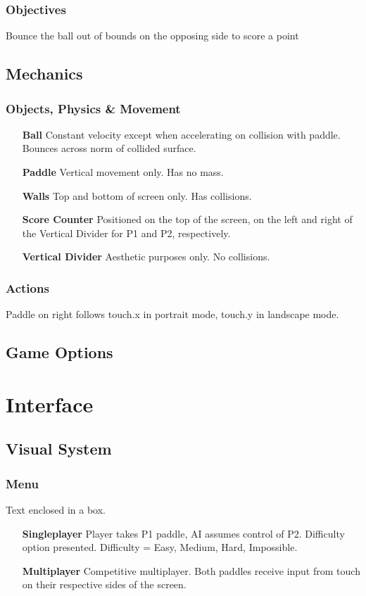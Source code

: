 \documentclass[12pt, letterpaper]{article}
\begin{document}
        \subsubsection{Objectives}
        Bounce the ball out of bounds on the opposing side to score a point
    \subsection{Mechanics}
        \subsubsection{Objects, Physics \& Movement}
        \begin{itemize}
            \item[\textbf{Ball}] Constant velocity except when accelerating on collision with paddle. Bounces across norm of collided surface.
            \item[\textbf{Paddle}] Vertical movement only. Has no mass.
            \item[\textbf{Walls}] Top and bottom of screen only. Has collisions.
            \item[\textbf{Score Counter}] Positioned on the top of the screen, on the left and right of the Vertical Divider for P1 and P2, respectively.
            \item[\textbf{Vertical Divider}] Aesthetic purposes only. No collisions. 
        \end{itemize}
        \subsubsection{Actions}
            Paddle on right follows touch.x in portrait mode, touch.y in landscape mode.
    \subsection{Game Options}
\section{Interface}
    \subsection{Visual System}
        \subsubsection{Menu}
        Text enclosed in a box.
        \begin{itemize}
            \item[\textbf{Singleplayer}] Player takes P1 paddle, AI assumes control of P2. Difficulty option presented. Difficulty = Easy, Medium, Hard, Impossible.
            \item[\textbf{Multiplayer}] Competitive multiplayer. Both paddles receive input from touch on their respective sides of the screen.
        \end{itemize}
\end{document}
